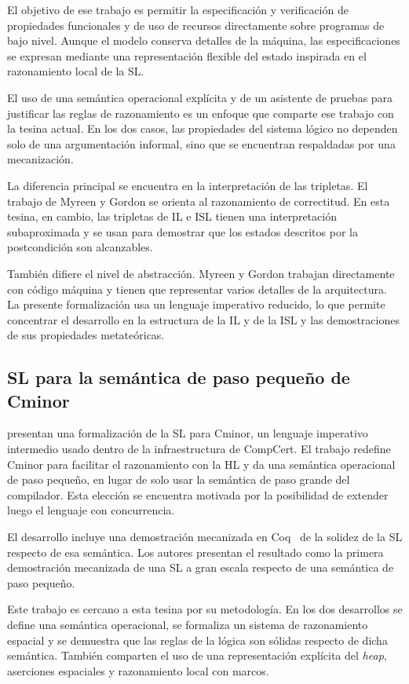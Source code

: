 \documentclass[a4paper,	11pt]{report}
\begin{document}
El objetivo de ese trabajo es permitir la especificación y verificación de propiedades funcionales
y de uso de recursos directamente sobre programas de bajo nivel.
Aunque el modelo conserva detalles de la máquina,
las especificaciones se expresan mediante una representación flexible del estado inspirada en el razonamiento local de la SL.

El uso de una semántica operacional explícita y de un asistente de pruebas para justificar las reglas de razonamiento
es un enfoque que comparte ese trabajo con la tesina actual.
En los dos casos,
las propiedades del sistema lógico no dependen solo de una argumentación informal,
sino que se encuentran respaldadas por una mecanización.

La diferencia principal se encuentra en la interpretación de las tripletas.
El trabajo de Myreen y Gordon se orienta al razonamiento de correctitud.
En esta tesina, en cambio,
las tripletas de IL e ISL tienen una interpretación subaproximada y se usan para demostrar que los estados descritos por la postcondición son alcanzables.

También difiere el nivel de abstracción.
Myreen y Gordon trabajan directamente con código máquina y tienen que representar varios detalles de la arquitectura.
La presente formalización usa un lenguaje imperativo reducido,
lo que permite concentrar el desarrollo en la estructura de la IL y de la ISL y las demostraciones de sus propiedades metateóricas.

\subsection*{SL para la semántica de paso pequeño de Cminor}
\citet{cminor} presentan una formalización de la SL para Cminor,
un lenguaje imperativo intermedio usado dentro de la infraestructura de CompCert.
El trabajo redefine Cminor para facilitar el razonamiento con la HL y da una semántica operacional de paso pequeño,
en lugar de solo usar la semántica de paso grande del compilador.
Esta elección se encuentra motivada por la posibilidad de extender luego el lenguaje con concurrencia.

El desarrollo incluye una demostración mecanizada en Coq~\citep{coq} de la solidez de la SL respecto de esa semántica.
Los autores presentan el resultado como la primera demostración mecanizada de una SL a gran escala respecto de una semántica de paso pequeño.

Este trabajo es cercano a esta tesina por su metodología.
En los dos desarrollos se define una semántica operacional,
se formaliza un sistema de razonamiento espacial y se demuestra que las reglas de la lógica son sólidas respecto de dicha semántica.
También comparten el uso de una representación explícita del \emph{heap},
aserciones espaciales y razonamiento local con marcos.
\end{document}
